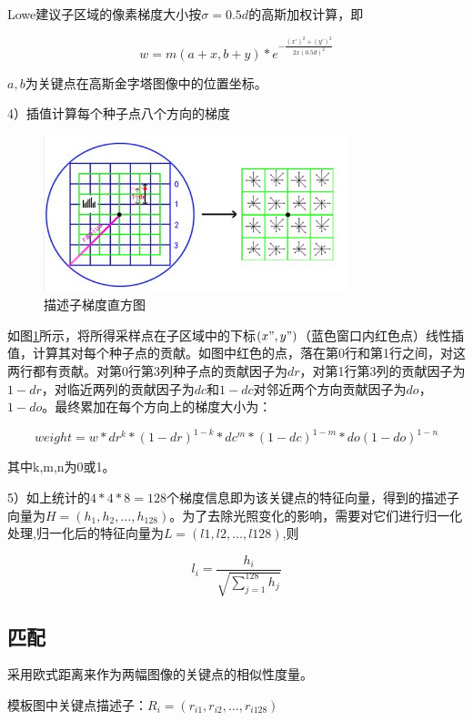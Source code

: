 \documentclass[12pt]{article}
\numberwithin{equation}{section}%
\begin{document}
Lowe建议子区域的像素梯度大小按$\sigma=0.5d$的高斯加权计算，即

\begin{equation}
w=m(a+x,b+y)*e^{-\frac{(x')^{2}+(y')^{2}}{2x(0.5d)^{2}}}
\end{equation}

$a,b$为关键点在高斯金字塔图像中的位置坐标。

4）插值计算每个种子点八个方向的梯度
\begin{figure}
  \centering\includegraphics[width=3.5in]{miaoshuzi.png}
  \caption{描述子梯度直方图}
 \label{miaoshuzi}
  \end{figure}

如图\ref{miaoshuzi}所示，将所得采样点在子区域中的下标$(x",y")$（蓝色窗口内红色点）线性插值，计算其对每个种子点的贡献。如图中红色的点，落在第0行和第1行之间，对这两行都有贡献。对第0行第3列种子点的贡献因子为$dr$，对第1行第3列的贡献因子为$1-dr$，对临近两列的贡献因子为$dc$和$1-dc$对邻近两个方向贡献因子为$do$，$1-do$。最终累加在每个方向上的梯度大小为：

\begin{equation}
weight=w*dr^{k}*(1-dr)^{1-k}*dc^{m}*(1-dc)^{1-m}*do(1-do)^{1-n}
\end{equation}

其中k,m,n为0或1。

5）如上统计的$4*4*8=128$个梯度信息即为该关键点的特征向量，得到的描述子向量为$H=(h_{1},h_{2},\ldots,h_{128})$。为了去除光照变化的影响，需要对它们进行归一化处理,归一化后的特征向量为$L=(l1,l2,\ldots,l128)$,则

\begin{equation}
l_{i}=\frac{h_{i}}{\sqrt{\sum_{j=1}^{128}h_{j}}}
\end{equation}

\subsection{匹配}

采用欧式距离来作为两幅图像的关键点的相似性度量。

模板图中关键点描述子：$R_{i}=(r_{i1},r_{i2},\ldots,r_{i128})$
\end{document}
